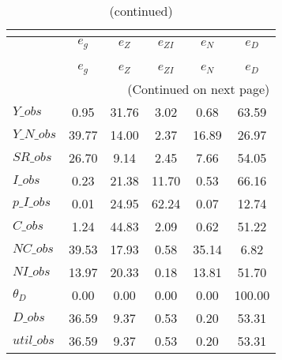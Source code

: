  
\begin{center}
\begin{longtable}{lccccc} 
\caption{VARIANCE DECOMPOSITION (in percent)}\\
 \label{Table:th_var_decomp_uncond}\\
\toprule 
$            $	 & 	 $       {e_g}$	 & 	 $       {e_Z}$	 & 	 $    {e_{ZI}}$	 & 	 $       {e_N}$	 & 	 $       {e_D}$\\
\midrule \endfirsthead 
\caption{(continued)}\\
 \toprule \\ 
$            $	 & 	 $       {e_g}$	 & 	 $       {e_Z}$	 & 	 $    {e_{ZI}}$	 & 	 $       {e_N}$	 & 	 $       {e_D}$\\
\midrule \endhead 
\midrule \multicolumn{6}{r}{(Continued on next page)} \\ \bottomrule \endfoot 
\bottomrule \endlastfoot 
$Y\_obs      $	 & 	        0.95	 & 	       31.76	 & 	        3.02	 & 	        0.68	 & 	       63.59 \\ 
$Y\_N\_obs   $	 & 	       39.77	 & 	       14.00	 & 	        2.37	 & 	       16.89	 & 	       26.97 \\ 
$SR\_obs     $	 & 	       26.70	 & 	        9.14	 & 	        2.45	 & 	        7.66	 & 	       54.05 \\ 
$I\_obs      $	 & 	        0.23	 & 	       21.38	 & 	       11.70	 & 	        0.53	 & 	       66.16 \\ 
$p\_I\_obs   $	 & 	        0.01	 & 	       24.95	 & 	       62.24	 & 	        0.07	 & 	       12.74 \\ 
$C\_obs      $	 & 	        1.24	 & 	       44.83	 & 	        2.09	 & 	        0.62	 & 	       51.22 \\ 
$NC\_obs     $	 & 	       39.53	 & 	       17.93	 & 	        0.58	 & 	       35.14	 & 	        6.82 \\ 
$NI\_obs     $	 & 	       13.97	 & 	       20.33	 & 	        0.18	 & 	       13.81	 & 	       51.70 \\ 
${\theta_D}  $	 & 	        0.00	 & 	        0.00	 & 	        0.00	 & 	        0.00	 & 	      100.00 \\ 
$D\_obs      $	 & 	       36.59	 & 	        9.37	 & 	        0.53	 & 	        0.20	 & 	       53.31 \\ 
$util\_obs   $	 & 	       36.59	 & 	        9.37	 & 	        0.53	 & 	        0.20	 & 	       53.31 \\ 
\end{longtable}
 \end{center}
